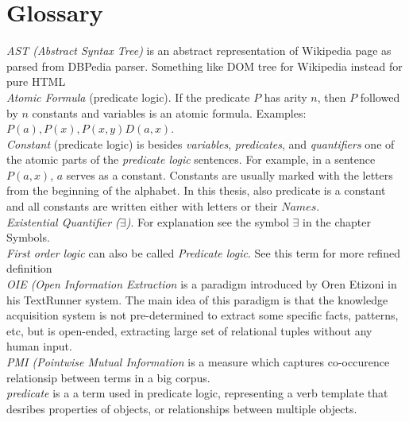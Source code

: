 % 
\chapter{Glossary}

\emph{AST (Abstract Syntax Tree)} is an abstract representation of Wikipedia 
page as parsed from DBPedia parser. Something like DOM tree for Wikipedia 
instead for pure HTML\\

\emph{Atomic Formula} (predicate logic). If the predicate $P$ has arity $n$,
then $P$ followed by $n$ constants and variables is an atomic formula. Examples:
$P(a), P(x), P(x,y) D(a,x)$.\\

\emph {Constant} (predicate logic) is besides \emph{variables}, 
\emph{predicates}, and \emph{quantifiers} one of the atomic parts of the 
\emph{predicate logic} sentences. For example, in a sentence $P(a,x)$, $a$ 
serves as a constant. Constants are usually marked with the letters from the
beginning of the alphabet. In this thesis, also predicate is a constant and
all constants are written either with letters or their $Names$.\\

\emph{Existential Quantifier ($\exists$)}. For explanation see the symbol
$\exists$ in the chapter Symbols.\\

\emph {First order logic} can also be called \emph{Predicate logic}. See this
term for more refined definition\\

\emph{OIE (Open Information Extraction} is a paradigm introduced by Oren Etizoni
in his TextRunner system. The main idea of this paradigm is that the knowledge 
acquisition system is not pre-determined to extract some specific facts, 
patterns, etc, but is open-ended, extracting large set of relational tuples 
without any human input.\\

\emph{PMI (Pointwise Mutual Information} is a measure which captures 
co-occurence relationsip between terms in a big corpus.\\

\emph{predicate} is a a term used in predicate logic, representing a verb
template that desribes properties of objects, or relationships between multiple
objects.\\

